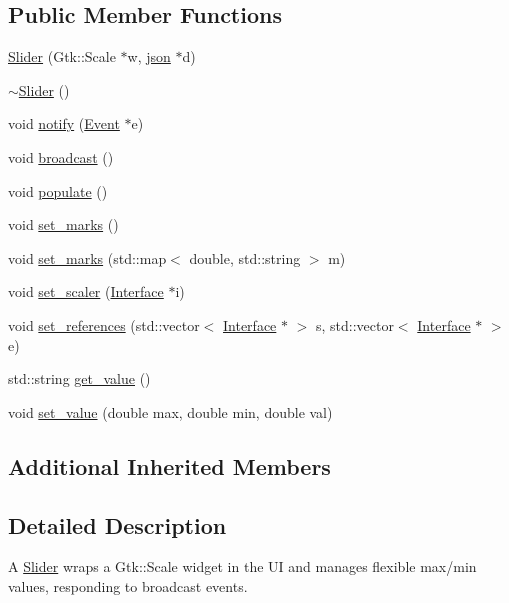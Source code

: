 \subsection*{Public Member Functions}
\begin{DoxyCompactItemize}
\item 
\hyperlink{classmc_1_1Slider_a33108d518cb39644076f6ca93f68ea4b}{Slider} (Gtk\+::\+Scale $\ast$w, \hyperlink{application_8hpp_ab701e3ac61a85b337ec5c1abaad6742d}{json} $\ast$d)
\item 
\hyperlink{classmc_1_1Slider_afde5e7b53d80e8667111d36099ba7297}{$\sim$\+Slider} ()
\item 
void \hyperlink{classmc_1_1Slider_af846178478b713ca0b04d2185aa337ba}{notify} (\hyperlink{classmc_1_1Event}{Event} $\ast$e)
\item 
void \hyperlink{classmc_1_1Slider_aa9d5bfade889ea320f0b51c98695a4bb}{broadcast} ()
\item 
void \hyperlink{classmc_1_1Slider_a42c9a7dc4cc7db0098f6a8e1313ae098}{populate} ()
\item 
void \hyperlink{classmc_1_1Slider_a4b2ebc10a9ea97fa6eeecf94607e0f34}{set\+\_\+marks} ()
\item 
void \hyperlink{classmc_1_1Slider_a3f205ea7c86933d51bd66388cbbcfd02}{set\+\_\+marks} (std\+::map$<$ double, std\+::string $>$ m)
\item 
void \hyperlink{classmc_1_1Slider_a8c42b47ca7a322012ca2d8e0942cd69e}{set\+\_\+scaler} (\hyperlink{classmc_1_1Interface}{Interface} $\ast$i)
\item 
void \hyperlink{classmc_1_1Slider_afb09c7ce8ac735c70515dee677d20d73}{set\+\_\+references} (std\+::vector$<$ \hyperlink{classmc_1_1Interface}{Interface} $\ast$ $>$ s, std\+::vector$<$ \hyperlink{classmc_1_1Interface}{Interface} $\ast$ $>$ e)
\item 
std\+::string \hyperlink{classmc_1_1Slider_a115495fc20368a6b8df56be831056cc3}{get\+\_\+value} ()
\item 
void \hyperlink{classmc_1_1Slider_a720804ffc2f064836538e2a21e38f3b3}{set\+\_\+value} (double max, double min, double val)
\end{DoxyCompactItemize}
\subsection*{Additional Inherited Members}


\subsection{Detailed Description}
A \hyperlink{classmc_1_1Slider}{Slider} wraps a Gtk\+::\+Scale widget in the UI and manages flexible max/min values, responding to broadcast events. 


